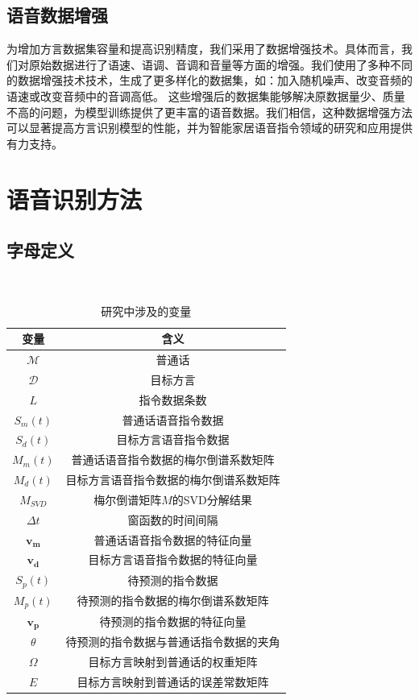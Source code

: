 \documentclass[lang=cn,cite=super]{elegantpaper}
\begin{document}
\subsection{语音数据增强}
为增加方言数据集容量和提高识别精度，我们采用了数据增强技术。具体而言，我们对原始数据进行了语速、语调、音调和音量等方面的增强。我们使用了多种不同的数据增强技术技术，生成了更多样化的数据集，如：加入随机噪声、改变音频的语速或改变音频中的音调高低。
这些增强后的数据集能够解决原数据量少、质量不高的问题，为模型训练提供了更丰富的语音数据。我们相信，这种数据增强方法可以显著提高方言识别模型的性能，并为智能家居语音指令领域的研究和应用提供有力支持。
\section{语音识别方法}
\subsection{字母定义}
\begin{table}[h]
    \caption{\label{tab:2} 研究中涉及的变量}\
    \begin{center}
        \begin{tabular}{cc}
            \hline \hline
            \textbf{变量} & \textbf{含义}\\
            \hline 
            $\mathcal{M}$ & 普通话\\
            $\mathcal{D}$ & 目标方言\\
            $L$ & 指令数据条数\\
            $S_m(t)$ & 普通话语音指令数据\\
            $S_d(t)$ & 目标方言语音指令数据\\
            $M_m(t)$ & 普通话语音指令数据的梅尔倒谱系数矩阵\\
            $M_d(t)$ & 目标方言语音指令数据的梅尔倒谱系数矩阵\\
            $M_{SVD}$ & 梅尔倒谱矩阵$M$的SVD分解结果\\
            $\Delta t$ & 窗函数的时间间隔\\
            $\bm{v_m}$ & 普通话语音指令数据的特征向量\\
            $\bm{v_d}$ & 目标方言语音指令数据的特征向量\\
            $S_p(t)$ & 待预测的指令数据\\
            $M_p(t)$ & 待预测的指令数据的梅尔倒谱系数矩阵\\
            $\bm{v_p}$ & 待预测的指令数据的特征向量\\
            $\theta$ & 待预测的指令数据与普通话指令数据的夹角\\
            $\Omega$ & 目标方言映射到普通话的权重矩阵\\
            $E$ & 目标方言映射到普通话的误差常数矩阵\\
            \hline \hline
        \end{tabular}
    \end{center}
\end{table}
\end{document}
